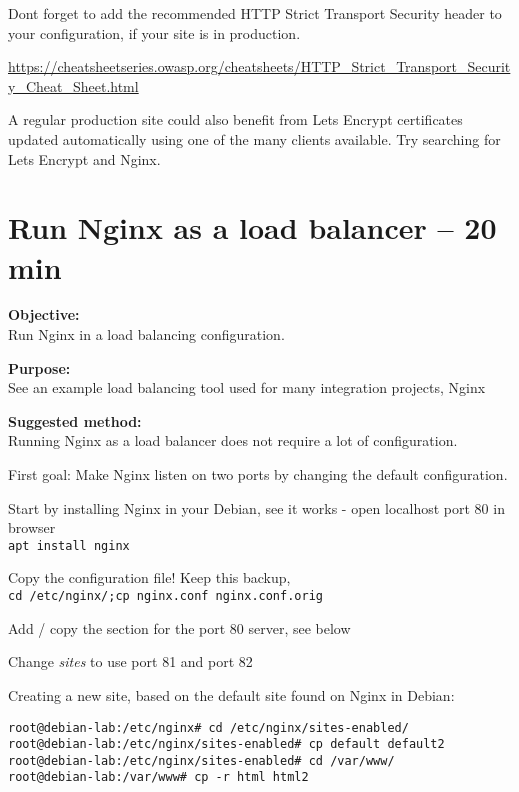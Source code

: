 \documentclass[a4paper,11pt,notitlepage]{report}
\begin{document}
Dont forget to add the recommended HTTP Strict Transport Security header to your configuration, if your site is in production.

{\footnotesize\url{https://cheatsheetseries.owasp.org/cheatsheets/HTTP_Strict_Transport_Security_Cheat_Sheet.html}}

A regular production site could also benefit from Lets Encrypt certificates updated automatically using one of the many clients available. Try searching for Lets Encrypt and Nginx.

\chapter{Run Nginx as a load balancer -- 20 min}
\label{ex:nginx-loadbalancer}


{\bf Objective:}\\
Run Nginx in a load balancing configuration.

{\bf Purpose:}\\
See an example load balancing tool used for many integration projects, Nginx

{\bf Suggested method:}\\
Running Nginx as a load balancer does not require a lot of configuration.

First goal: Make Nginx listen on two ports by changing the default configuration.

\begin{list2}
\item Start by installing Nginx in your Debian, see it works - open localhost port 80 in browser\\
\verb+apt install nginx+
\item Copy the configuration file! Keep this backup,\\
\verb+cd /etc/nginx/;cp nginx.conf nginx.conf.orig+
\item Add / copy the section for the port 80 server, see below
\item Change \emph{sites} to use port 81 and port 82
\end{list2}


Creating a new site, based on the default site found on Nginx in Debian:
\begin{verbatim}
root@debian-lab:/etc/nginx# cd /etc/nginx/sites-enabled/
root@debian-lab:/etc/nginx/sites-enabled# cp default default2
root@debian-lab:/etc/nginx/sites-enabled# cd /var/www/
root@debian-lab:/var/www# cp -r html html2
\end{verbatim}
\end{document}
